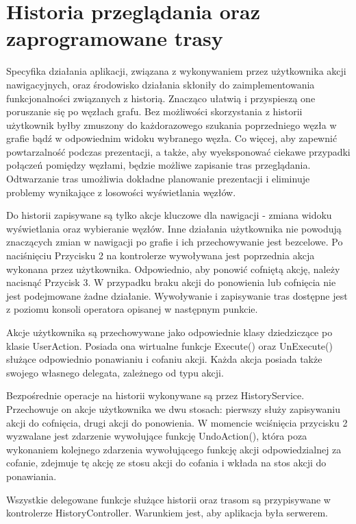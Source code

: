 ﻿\section{Historia przeglądania oraz zaprogramowane trasy}
Specyfika działania aplikacji, związana z wykonywaniem przez użytkownika akcji nawigacyjnych, oraz środowisko działania skłoniły do zaimplementowania funkcjonalności związanych z historią. Znacząco ułatwią i przyspieszą one poruszanie się po węzłach grafu. Bez możliwości skorzystania z historii użytkownik byłby zmuszony do każdorazowego szukania poprzedniego węzła  w grafie bądź w odpowiednim widoku wybranego węzła. Co więcej, aby zapewnić powtarzalność podczas prezentacji, a także, aby wyeksponować ciekawe przypadki połączeń pomiędzy węzłami, będzie możliwe zapisanie tras przeglądania. Odtwarzanie tras umożliwia dokładne planowanie prezentacji i eliminuje problemy wynikające z losowości wyświetlania węzłów. 

Do historii zapisywane są tylko akcje kluczowe dla nawigacji - zmiana widoku wyświetlania oraz wybieranie węzłów. Inne działania użytkownika nie powodują znaczących zmian w nawigacji po grafie i ich przechowywanie jest bezcelowe. Po naciśnięciu Przycisku 2 na kontrolerze wywoływana jest poprzednia akcja wykonana przez użytkownika. Odpowiednio, aby ponowić cofniętą akcję, należy nacisnąć Przycisk 3. W przypadku braku akcji do ponowienia lub cofnięcia nie jest podejmowane żadne działanie. Wywoływanie i zapisywanie tras dostępne jest z poziomu konsoli operatora opisanej w następnym punkcie.


Akcje użytkownika są przechowywane jako odpowiednie klasy dziedziczące po klasie UserAction. Posiada ona wirtualne funkcje Execute() oraz UnExecute() służące odpowiednio ponawianiu i cofaniu akcji. Każda akcja posiada także swojego własnego delegata, zależnego od typu akcji. 

Bezpośrednie operacje na historii wykonywane są przez HistoryService. Przechowuje on akcje użytkownika we dwu stosach: pierwszy służy zapisywaniu akcji do cofnięcia, drugi akcji do ponowienia. W momencie wciśnięcia przycisku 2 wyzwalane jest zdarzenie wywołujące funkcję UndoAction(), która poza wykonaniem kolejnego zdarzenia wywołującego funkcję akcji odpowiedzialnej za cofanie, zdejmuje tę akcję ze stosu akcji do cofania i wkłada na stos akcji do ponawiania.

Wszystkie delegowane funkcje służące historii oraz trasom są przypisywane w kontrolerze HistoryController. Warunkiem jest, aby aplikacja była serwerem.

